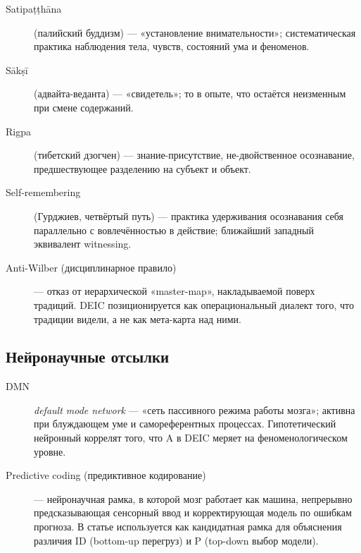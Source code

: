 \begin{description}
    \item[Satipa\d{t}\d{t}h\=ana] (палийский буддизм) --- «установление внимательности»; систематическая практика наблюдения тела, чувств, состояний ума и феноменов.
    \item[S\=ak\d{s}\=i] (адвайта-веданта) --- «свидетель»; то в опыте, что остаётся неизменным при смене содержаний.
    \item[Rigpa] (тибетский дзогчен) --- знание-присутствие, не-двойственное осознавание, предшествующее разделению на субъект и объект.
    \item[Self-remembering] (Гурджиев, четвёртый путь) --- практика удерживания осознавания себя параллельно с вовлечённостью в действие; ближайший западный эквивалент witnessing.
    \item[Anti-Wilber (дисциплинарное правило)] --- отказ от иерархической «master-map», накладываемой поверх традиций. DEIC позиционируется как операциональный диалект того, что традиции видели, а не как мета-карта над ними.
\end{description}

\subsection*{Нейронаучные отсылки}

\begin{description}
    \item[DMN] \textit{default mode network} --- «сеть пассивного режима работы мозга»; активна при блуждающем уме и самореферентных процессах. Гипотетический нейронный коррелят того, что A в DEIC меряет на феноменологическом уровне.
    \item[Predictive coding (предиктивное кодирование)] --- нейронаучная рамка, в которой мозг работает как машина, непрерывно предсказывающая сенсорный ввод и корректирующая модель по ошибкам прогноза. В статье используется как кандидатная рамка для объяснения различия ID (bottom-up перегруз) и P (top-down выбор модели).
\end{description}

\clearpage
